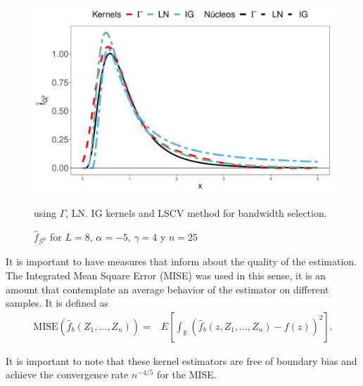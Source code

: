 \documentclass[twocolumn]{svjour3}
\begin{document}
\begin{figure}[H]
	\includegraphics[scale=0.35]{../../../Figures/PaperTesis/NucleosGALNyIG}
	\caption{\label{EstimacionLNyGAyIG} $\widehat{f}_{\mathcal{G}^0}$ for $L=8$, $\alpha=-5$, $\gamma=4$ y $n=25$} using $\Gamma$, LN. IG kernels and LSCV method for bandwidth selection.
\end{figure}


It is important to have measures that inform about the quality of the estimation. The Integrated Mean Square Error (MISE) was used in this sense, it is an amount that
contemplate an average behavior of the estimator on different samples. It is defined as
\begin{align}
\label{Mise}
\text{MISE}(\widehat{f}_b(Z_1,\ldots,Z_n))=&E\left[\int_\mathbb{R} (\widehat{f}_b(z,Z_1,\ldots,Z_n)-f(z))^2 \right].
\end{align}

It is important to note that these kernel estimators are free of boundary bias and achieve the convergence rate $n^{-4/5}$ for the MISE.

\end{document}
